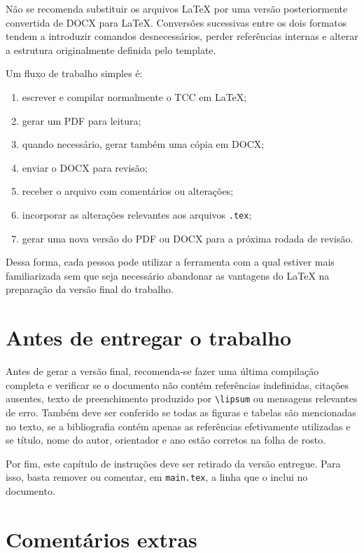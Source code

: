 Não se recomenda substituir os arquivos LaTeX por uma versão posteriormente convertida de DOCX para LaTeX. Conversões sucessivas entre os dois formatos tendem a introduzir comandos desnecessários, perder referências internas e alterar a estrutura originalmente definida pelo template.

Um fluxo de trabalho simples é:

\begin{enumerate}
\item escrever e compilar normalmente o TCC em LaTeX;
\item gerar um PDF para leitura;
\item quando necessário, gerar também uma cópia em DOCX;
\item enviar o DOCX para revisão;
\item receber o arquivo com comentários ou alterações;
\item incorporar as alterações relevantes aos arquivos \verb|.tex|;
\item gerar uma nova versão do PDF ou DOCX para a próxima rodada de revisão.
\end{enumerate}

Dessa forma, cada pessoa pode utilizar a ferramenta com a qual estiver mais familiarizada sem que seja necessário abandonar as vantagens do LaTeX na preparação da versão final do trabalho.

\section{Antes de entregar o trabalho}
\label{sec:antes_entrega}

Antes de gerar a versão final, recomenda-se fazer uma última compilação completa e verificar se o documento não contém referências indefinidas, citações ausentes, texto de preenchimento produzido por \verb|\lipsum| ou mensagens relevantes de erro. Também deve ser conferido se todas as figuras e tabelas são mencionadas no texto, se a bibliografia contém apenas as referências efetivamente utilizadas e se título, nome do autor, orientador e ano estão corretos na folha de rosto.

Por fim, este capítulo de instruções deve ser retirado da versão entregue. Para isso, basta remover ou comentar, em \verb|main.tex|, a linha que o inclui no documento.

\section{Comentários extras}
\label{sec:comentarios_extras}

